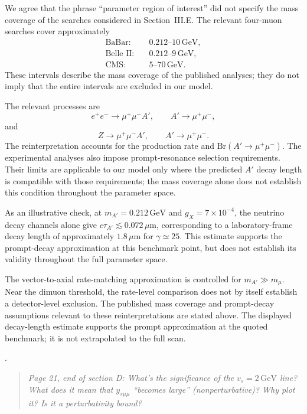 \documentclass[12pt,a4paper]{article}
\begin{document}
We agree that the phrase ``parameter region of interest'' did not specify the mass coverage of the searches considered in Section~III.E. The relevant four-muon searches cover approximately
\[
\begin{aligned}
\text{BaBar}:&\quad 0.212\text{--}10\,\mathrm{GeV},\\
\text{Belle II}:&\quad 0.212\text{--}9\,\mathrm{GeV},\\
\text{CMS}:&\quad 5\text{--}70\,\mathrm{GeV}.
\end{aligned}
\]
These intervals describe the mass coverage of the published analyses; they do not imply that the entire intervals are excluded in our model.

The relevant processes are
\[
e^+e^-\to\mu^+\mu^-A',
\qquad A'\to\mu^+\mu^-,
\]
and
\[
Z\to\mu^+\mu^-A',
\qquad A'\to\mu^+\mu^-.
\]
The reinterpretation accounts for the production rate and \(\mathrm{Br}(A'\to\mu^+\mu^-)\). The experimental analyses also impose prompt-resonance selection requirements. Their limits are applicable to our model only where the predicted \(A'\) decay length is compatible with those requirements; the mass coverage alone does not establish this condition throughout the parameter space.

As an illustrative check, at \(m_{A'}=0.212\,\mathrm{GeV}\) and \(g_X=7\times10^{-4}\), the neutrino decay channels alone give \(c\tau_{A'}\lesssim0.072\,\mu\mathrm{m}\), corresponding to a laboratory-frame decay length of approximately \(1.8\,\mu\mathrm{m}\) for \(\gamma\simeq25\). This estimate supports the prompt-decay approximation at this benchmark point, but does not establish its validity throughout the full parameter space.

The vector-to-axial rate-matching approximation is controlled for \(m_{A'}\gg m_\mu\). Near the dimuon threshold, the rate-level comparison does not by itself establish a detector-level exclusion. The published mass coverage and prompt-decay assumptions relevant to these reinterpretations are stated above. The displayed decay-length estimate supports the prompt approximation at the quoted benchmark; it is not extrapolated to the full scan.

\medskip
{}. \begin{quote}\itshape
Page 21, end of section D: What's the significance of the \(v_s=2\,\mathrm{GeV}\) line? What does it mean that \(y_{s\mu\mu}\) ``becomes large'' (nonperturbative)? Why plot it? Is it a perturbativity bound?
\end{quote}
\end{document}
